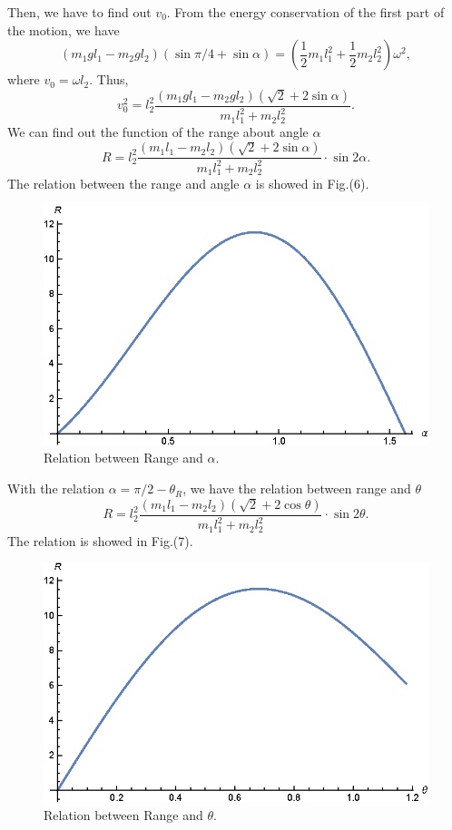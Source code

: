 \documentclass[%
reprint,
amsmath,amssymb,
aps,
]{revtex4-1}
\begin{document}
	Then, we have to find out $v_0$. From the energy conservation of the first part of the motion, we have
	\begin{equation}
	(m_1gl_1-m_2gl_2)(\sin{\pi/4}+\sin{\alpha})
	=\left(\frac{1}{2}m_1l_1^2+\frac{1}{2}m_2l_2^2\right)\omega^2,
	\end{equation}
	where $v_0=\omega l_2$.
	Thus,
	\begin{equation}
	v_0^2=l_2^2\frac{(m_1gl_1-m_2gl_2)(\sqrt{2}+2\sin{\alpha})}{m_1l_1^2+m_2l_2^2}.
	\end{equation}
	We can find out the function of the range about angle $\alpha$
	\begin{equation}
	R=l_2^2\frac{(m_1l_1-m_2l_2)(\sqrt{2}+2\sin{\alpha})}{m_1l_1^2+m_2l_2^2}\cdot\sin{2\alpha}.
	\end{equation}
	The relation between the range and angle $\alpha$ is showed in Fig.(6).
	\begin{figure}[h]
		\centering
		\includegraphics[scale=0.8]{See-SawRangevsAlpha.eps}
		\caption{Relation between Range and $\alpha$.}
		\label{fig:my_label1}
	\end{figure}
	With the relation $\alpha=\pi/2-\theta_R$, we have the relation between range and $\theta$
	\begin{equation}
	R=l_2^2\frac{(m_1l_1-m_2l_2)(\sqrt{2}+2\cos{\theta})}{m_1l_1^2+m_2l_2^2}\cdot\sin{2\theta}.
	\end{equation}
	The relation is showed in Fig.(7).
	\begin{figure}[h]
		\centering
		\includegraphics[scale=0.8]{See-SawRangevsTheta.eps}
		\caption{Relation between Range and $\theta$.}
		\label{fig:my_label2}
	\end{figure}
\end{document}
